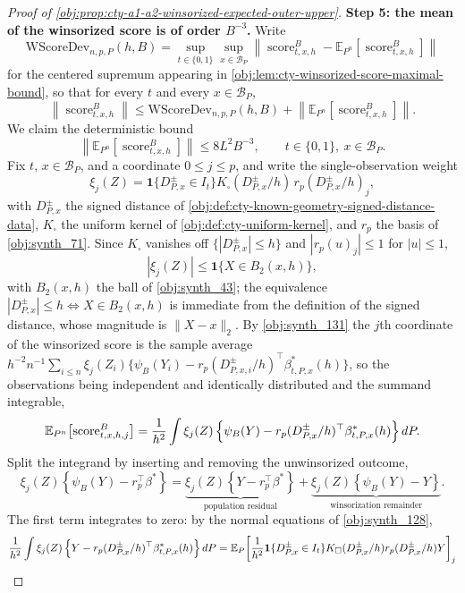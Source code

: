 \documentclass[11pt]{article}
\begin{document}
\begin{proof}[Proof of \cref{obj:prop:cty-a1-a2-winsorized-expected-outer-upper}]
\textbf{Step 5: the mean of the winsorized score is of order \(B^{-3}\).}  Write
\[
\mathrm{WScoreDev}_{n,p,P}(h,B)
=
\sup_{t\in\{0,1\}}\sup_{x\in\mathcal B_P}
\left\lVert
\operatorname{score}^{B}_{t,x,h}
-\mathbb E_{P^n}\!\left[\operatorname{score}^{B}_{t,x,h}\right]
\right\rVert
\]
for the centered supremum appearing in \cref{obj:lem:cty-winsorized-score-maximal-bound}, so that for every \(t\) and every \(x\in\mathcal B_P\),
\[
\left\lVert\operatorname{score}^{B}_{t,x,h}\right\rVert
\leq
\mathrm{WScoreDev}_{n,p,P}(h,B)
+
\left\lVert\mathbb E_{P^n}\!\left[\operatorname{score}^{B}_{t,x,h}\right]\right\rVert .
\]
We claim the deterministic bound
\[
\left\lVert\mathbb E_{P^n}\!\left[\operatorname{score}^{B}_{t,x,h}\right]\right\rVert
\leq
8L^2B^{-3},
\qquad t\in\{0,1\},\ x\in\mathcal B_P .
\]
Fix \(t\), \(x\in\mathcal B_P\), and a coordinate \(0\leq j\leq p\), and write the single-observation weight
\[
\xi_j(Z)
=
\mathbf 1\{D^{\pm}_{P,x}\in I_t\}
K_\square(D^{\pm}_{P,x}/h)\,
r_p(D^{\pm}_{P,x}/h)_j ,
\]
with \(D^{\pm}_{P,x}\) the signed distance of \cref{obj:def:cty-known-geometry-signed-distance-data}, \(K_\square\) the uniform kernel of \cref{obj:def:cty-uniform-kernel}, and \(r_p\) the basis of \cref{obj:synth_71}.  Since \(K_\square\) vanishes off \(\{|D^{\pm}_{P,x}|\leq h\}\) and \(|r_p(u)_j|\leq1\) for \(|u|\leq1\),
\[
|\xi_j(Z)|\leq\mathbf 1\{X\in B_2(x,h)\} ,
\]
with \(B_2(x,h)\) the ball of \cref{obj:synth_43}; the equivalence \(|D^{\pm}_{P,x}|\leq h\iff X\in B_2(x,h)\) is immediate from the definition of the signed distance, whose magnitude is \(\lVert X-x\rVert_2\).  By \cref{obj:synth_131} the \(j\)th coordinate of the winsorized score is the sample average \(h^{-2}n^{-1}\sum_{i\leq n}\xi_j(Z_i)\{\psi_B(Y_i)-r_p(D^{\pm}_{P,x,i}/h)^\top\beta^*_{t,P,x}(h)\}\), so the observations being independent and identically distributed and the summand integrable,
\[
\mathbb E_{P^n}\!\left[\operatorname{score}^{B}_{t,x,h,j}\right]
=
{1\over h^2}\int
\xi_j(Z)\left\{\psi_B(Y)-r_p(D^{\pm}_{P,x}/h)^\top\beta^*_{t,P,x}(h)\right\}dP .
\]
Split the integrand by inserting and removing the unwinsorized outcome,
\[
\xi_j(Z)\left\{\psi_B(Y)-r_p^\top\beta^*\right\}
=
\underbrace{\xi_j(Z)\left\{Y-r_p^\top\beta^*\right\}}_{\text{population residual}}
+
\underbrace{\xi_j(Z)\left\{\psi_B(Y)-Y\right\}}_{\text{winsorization remainder}} .
\]
The first term integrates to zero: by the normal equations of \cref{obj:synth_128},
\[
{1\over h^2}\int\xi_j(Z)\left\{Y-r_p(D^{\pm}_{P,x}/h)^\top\beta^*_{t,P,x}(h)\right\}dP
=
\mathbb E_P\!\left[{1\over h^2}\mathbf 1\{D^{\pm}_{P,x}\in I_t\}K_\square(D^{\pm}_{P,x}/h)r_p(D^{\pm}_{P,x}/h)Y\right]_j
\]
\end{proof}
\end{document}
